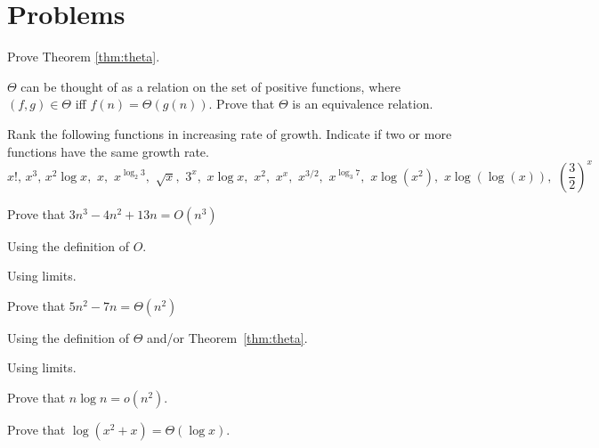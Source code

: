 \section{Problems}

\begin{pro}
Prove Theorem \ref{thm:theta}.
\end{pro}

\begin{pro}
$\Theta$ can be thought of as a relation on the set of positive functions, 
where $(f,g)\in\Theta$ iff $f(n)=\Theta(g(n))$.
Prove that $\Theta$ is an equivalence relation. 
\end{pro}

\begin{pro}
Rank the following functions in increasing rate of growth.  
Indicate if two or more functions have the same growth rate.
$$     
x!, \,  
x^3,\, 
x^2\log x,\, \,
x,\, \,     
x^{\log_2 3},\, \,   
\sqrt{x},\, \,   
3^x,\, \,   
x \log x,\, \,  
x^2,\, \,    
x^x,\, \, 
x^{3/2},\, \, 
x^{\log_3 7},\, \,  
x\log(x^2),\, \, 
x\log(\log(x)),\, \, 
\left(\frac{3}{2}\right)^x
$$
\end{pro}

\begin{pro}
Prove that $3n^3-4n^2+13n=O(n^3)$
\begin{lenum}
\item
Using the definition of $O$.
\item
Using limits.
\end{lenum}
\end{pro}

\begin{pro}
Prove that $5n^2-7n=\Theta(n^2)$
\begin{lenum}
\item
Using the definition of $\Theta$ and/or Theorem~\ref{thm:theta}.
\item
Using limits.
\end{lenum}
\end{pro}

\begin{pro}
Prove that $n\log n=o(n^2)$.
\end{pro}

\begin{pro}
Prove that $\log(x^2+x)=\Theta(\log x)$.
\end{pro}

